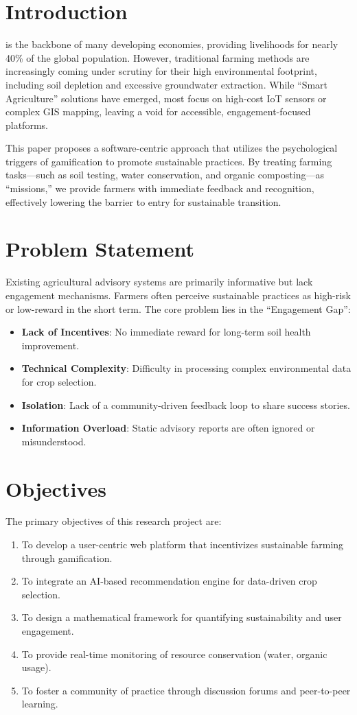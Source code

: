 \documentclass[journal]{IEEEtran}
\begin{document}
\section{Introduction}
 is the backbone of many developing economies, providing livelihoods for nearly 40\% of the global population. However, traditional farming methods are increasingly coming under scrutiny for their high environmental footprint, including soil depletion and excessive groundwater extraction. While ``Smart Agriculture'' solutions have emerged, most focus on high-cost IoT sensors or complex GIS mapping, leaving a void for accessible, engagement-focused platforms.

This paper proposes a software-centric approach that utilizes the psychological triggers of gamification to promote sustainable practices. By treating farming tasks---such as soil testing, water conservation, and organic composting---as ``missions,'' we provide farmers with immediate feedback and recognition, effectively lowering the barrier to entry for sustainable transition.

\section{Problem Statement}
Existing agricultural advisory systems are primarily informative but lack engagement mechanisms. Farmers often perceive sustainable practices as high-risk or low-reward in the short term. The core problem lies in the ``Engagement Gap'':
\begin{itemize}
    \item \textbf{Lack of Incentives}: No immediate reward for long-term soil health improvement.
    \item \textbf{Technical Complexity}: Difficulty in processing complex environmental data for crop selection.
    \item \textbf{Isolation}: Lack of a community-driven feedback loop to share success stories.
    \item \textbf{Information Overload}: Static advisory reports are often ignored or misunderstood.
\end{itemize}

\section{Objectives}
The primary objectives of this research project are:
\begin{enumerate}
    \item To develop a user-centric web platform that incentivizes sustainable farming through gamification.
    \item To integrate an AI-based recommendation engine for data-driven crop selection.
    \item To design a mathematical framework for quantifying sustainability and user engagement.
    \item To provide real-time monitoring of resource conservation (water, organic usage).
    \item To foster a community of practice through discussion forums and peer-to-peer learning.
\end{enumerate}
\end{document}
